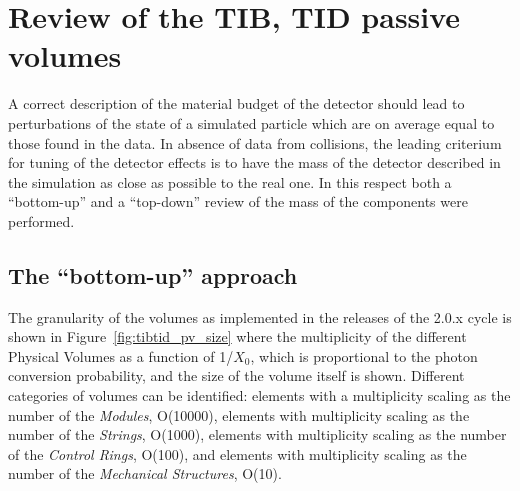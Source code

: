 \documentclass{cmspaper}
\begin{document}
\section{Review of the TIB, TID passive volumes}
A correct description of the material budget of the detector should lead
to perturbations of the state of a simulated particle which are on average equal
to those found in the data.  
In absence of data from collisions, the leading criterium for tuning of
the detector effects is to have the mass of the detector described in
the simulation as close as possible to the real one.
In this respect both a ``bottom-up'' and a ``top-down'' review of the mass
of the components were performed.
\subsection{The ``bottom-up'' approach}
The granularity of the volumes as implemented in the releases of the
2.0.x cycle is shown in Figure~\ref{fig:tibtid_pv_size} where the multiplicity of the
different Physical Volumes as a function of 1/$X_0$, which is
proportional to the photon conversion probability, and the size of
the volume itself is shown. Different categories of volumes can be
identified: elements with a multiplicity scaling as the number of the
{\it Modules}, O(10000),  elements with multiplicity scaling as the number
of the {\it Strings}, O(1000), elements with multiplicity scaling as the
number of the {\it Control Rings}, O(100), and elements with multiplicity
scaling as the number of the {\it Mechanical Structures}, O(10). 
\end{document}
